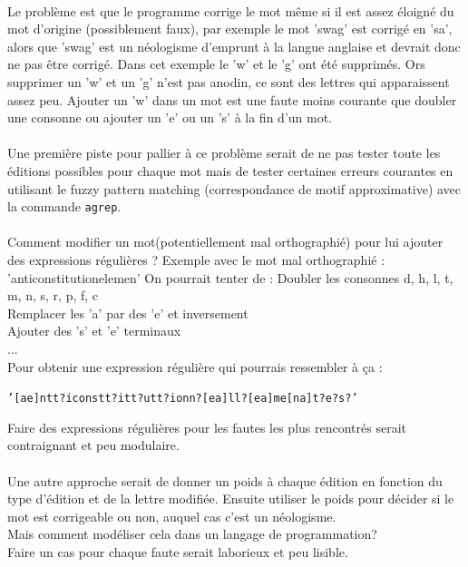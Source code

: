 \documentclass{article}
\begin{document}
\paragraph*{}
Le problème est que le programme corrige le mot même si il est assez éloigné du mot d'origine (possiblement faux), par exemple le mot 'swag' est corrigé en 'sa', alors que 'swag' est un néologisme d'emprunt à la langue anglaise et devrait donc ne pas être corrigé. Dans cet exemple le 'w' et le 'g' ont été supprimés. Ors supprimer un 'w' et un 'g' n'est pas anodin, ce sont des lettres qui apparaissent assez peu. Ajouter un 'w' dans un mot est une faute moins courante que doubler une consonne ou ajouter un 'e' ou un 's' à la fin d'un mot.
\paragraph*{}
Une première piste pour pallier à ce problème serait de ne pas tester toute les éditions possibles pour chaque mot mais de tester certaines erreurs courantes en utilisant le fuzzy pattern matching (correspondance de motif approximative) avec la commande \texttt{agrep}.
\paragraph*{}
Comment modifier un mot(potentiellement mal orthographié) pour lui ajouter des expressions régulières ?\newline
Exemple avec le mot mal orthographié : 'anticonstitutionelemen'\newline
On pourrait tenter de :\newline
Doubler les consonnes d, h, l, t, m, n, s, r, p, f, c\\
Remplacer les 'a' par des 'e' et inversement\\
Ajouter des 's' et 'e' terminaux\\
...\\
Pour obtenir une expression régulière qui pourrais ressembler à ça :
\begin{center}
\texttt{'[ae]ntt?iconstt?itt?utt?ionn?[ea]ll?[ea]me[na]t?e?s?'}\\
\end{center}
Faire des expressions régulières pour les fautes les plus rencontrés serait contraignant et peu modulaire.
\paragraph*{}
Une autre approche serait de donner un poids à chaque édition en fonction du type d'édition et de la lettre modifiée. Ensuite utiliser le poids pour décider si le mot est corrigeable ou non, auquel cas c'est un néologisme.\\
Mais comment modéliser cela dans un langage de programmation?\\
Faire un cas pour chaque faute serait laborieux et peu lisible.
\end{document}
